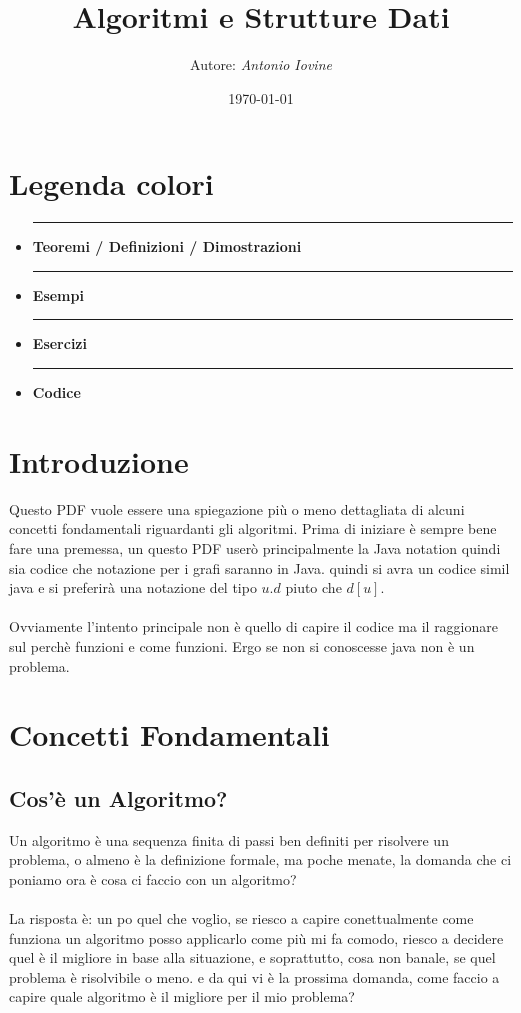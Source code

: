 \documentclass[a4paper,12pt]{article}
\begin{document}
\title{Algoritmi e Strutture Dati}
\author{Autore: \textit{Antonio Iovine}}
\date{\today}
\maketitle

\tableofcontents

\section*{Legenda colori}
\begin{itemize}
  \item \textcolor{teorema}{\rule{1cm}{3pt}} \textbf{Teoremi / Definizioni / Dimostrazioni}
  \item \textcolor{esempio}{\rule{1cm}{3pt}} \textbf{Esempi}
  \item \textcolor{esercizio}{\rule{1cm}{3pt}} \textbf{Esercizi}
  \item \textcolor{codice}{\rule{1cm}{3pt}} \textbf{Codice}
\end{itemize}

\newpage

\section{Introduzione}
Questo PDF vuole essere una spiegazione più o meno dettagliata di alcuni concetti fondamentali riguardanti gli algoritmi.
Prima di iniziare è sempre bene fare una premessa, un questo PDF userò principalmente la Java notation quindi sia codice che notazione per i grafi saranno in Java.
quindi si avra un codice simil java e si preferirà una notazione del tipo $u.d$ piuto che $d[u]$.
\\
\\
Ovviamente l'intento principale non è quello di capire il codice ma il raggionare sul perchè funzioni e come funzioni. Ergo se non si conoscesse java non è un problema.

\section{Concetti Fondamentali}

\subsection{Cos'è un Algoritmo?}
Un algoritmo è una sequenza finita di passi ben definiti per risolvere un problema, o almeno è la definizione formale, ma poche menate, la domanda che ci poniamo ora è
cosa ci faccio con un algoritmo?
\\  
\\
La risposta è: un po quel che voglio, se riesco a capire conettualmente come funziona un algoritmo posso applicarlo come più mi fa comodo, riesco a decidere quel è il migliore in base alla situazione, e soprattutto, cosa non banale, se quel problema è risolvibile o meno.
e da qui vi è la prossima domanda, come faccio a capire quale algoritmo è il migliore per il mio problema?
\end{document}
